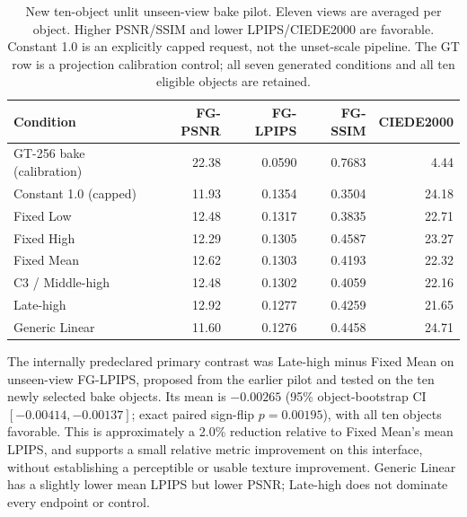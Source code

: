 \documentclass[times,twocolumn,final]{elsarticle}
\providecommand{\DIFadd}[1]{{\protect\color{blue} \sf #1}} %
\providecommand{\DIFaddbegin}{} %
\providecommand{\DIFaddend}{} %
\providecommand{\DIFaddFL}[1]{\DIFadd{#1}} %
\providecommand{\DIFaddbeginFL}{\DIFaddbegin} %
\providecommand{\DIFaddendFL}{\DIFaddend} %
\renewcommand{\DIFaddbeginFL}{}
\renewcommand{\DIFaddendFL}{}
\renewcommand{\DIFaddFL}[1]{#1}
\begin{document}
  \DIFaddbeginFL \begin{table}[ht]
\DIFaddendFL \centering  \DIFaddbeginFL \scriptsize
\caption{New ten-object unlit unseen-view bake pilot. Eleven views are averaged per object. Higher PSNR/SSIM and lower LPIPS/CIEDE2000 are favorable. Constant 1.0 is an explicitly capped request, not the unset-scale pipeline. The GT row is a projection calibration control; all seven generated conditions and all ten eligible objects are retained.}
\label{tab:new-bake}
\begin{tabular}{lrrrr}
\DIFaddendFL \toprule   \DIFaddbeginFL \DIFaddFL{Condition }\DIFaddendFL &   \DIFaddbeginFL \DIFaddFL{FG-PSNR }\DIFaddendFL &   \DIFaddbeginFL \DIFaddFL{FG-LPIPS }\DIFaddendFL &   \DIFaddbeginFL \DIFaddFL{FG-SSIM }& \DIFaddFL{CIEDE2000 }\DIFaddendFL \\
\midrule
  \DIFaddbeginFL \DIFaddFL{GT-256 bake (calibration) }\DIFaddendFL &   \DIFaddbeginFL \DIFaddFL{22.38 }\DIFaddendFL &   \DIFaddbeginFL \DIFaddFL{0.0590 }\DIFaddendFL &   \DIFaddbeginFL \DIFaddFL{0.7683 }& \DIFaddFL{4.44 }\DIFaddendFL \\
  \DIFaddbeginFL \DIFaddFL{Constant 1.0 (capped) }\DIFaddendFL &   \DIFaddbeginFL \DIFaddFL{11.93 }\DIFaddendFL &   \DIFaddbeginFL \DIFaddFL{0.1354 }\DIFaddendFL &   \DIFaddbeginFL \DIFaddFL{0.3504 }& \DIFaddFL{24.18 }\\
\DIFaddFL{Fixed Low }& \DIFaddFL{12.48 }& \DIFaddFL{0.1317 }& \DIFaddFL{0.3835 }& \DIFaddFL{22.71 }\\
\DIFaddFL{Fixed High }& \DIFaddFL{12.29 }& \DIFaddFL{0.1305 }& \DIFaddFL{0.4587 }& \DIFaddFL{23.27 }\\
\DIFaddFL{Fixed Mean }& \DIFaddFL{12.62 }& \DIFaddFL{0.1303 }& \DIFaddFL{0.4193 }& \DIFaddFL{22.32 }\DIFaddendFL \\
C3   \DIFaddbeginFL \DIFaddFL{/ Middle-high }\DIFaddendFL &   \DIFaddbeginFL \DIFaddFL{12.48 }\DIFaddendFL &   \DIFaddbeginFL \DIFaddFL{0.1302 }\DIFaddendFL &   \DIFaddbeginFL \DIFaddFL{0.4059 }& \DIFaddFL{22.16 }\\
\DIFaddFL{Late-high }& \DIFaddFL{12.92 }& \DIFaddFL{0.1277 }& \DIFaddFL{0.4259 }& \DIFaddFL{21.65 }\\
\DIFaddFL{Generic Linear }& \DIFaddFL{11.60 }& \DIFaddFL{0.1276 }& \DIFaddFL{0.4458 }& \DIFaddFL{24.71 }\DIFaddendFL \\
\bottomrule\end{tabular}
\end{table}

  \DIFaddbegin \DIFadd{The internally predeclared primary contrast was Late-high minus Fixed Mean on unseen-view FG-LPIPS, proposed from the earlier pilot and tested on the ten newly selected bake objects. Its mean is $-0.00265$ (95\% object-bootstrap CI $[-0.00414,-0.00137]$; exact paired sign-flip $p=0.00195$), with all ten objects favorable. This is approximately a 2.0\% reduction relative to Fixed Mean's mean LPIPS, and supports a small relative metric improvement on this interface, without establishing a perceptible or usable texture improvement. Generic Linear has a slightly lower mean LPIPS but lower PSNR; Late-high does not dominate every endpoint or control.
}
\end{document}
